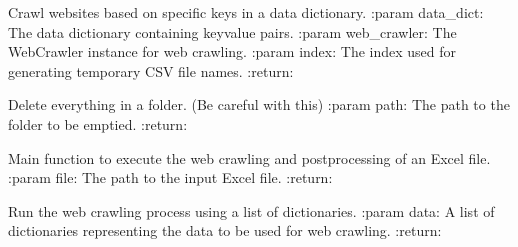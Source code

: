 \documentclass[letterpaper,10pt,english]{sphinxmanual}
\begin{document}

\begin{fulllineitems}
\label{\detokenize{main:main.crawl_with_keys}}
\pysigstartsignatures
{}
\pysigstopsignatures
\sphinxAtStartPar
Crawl websites based on specific keys in a data dictionary.
:param data\_dict: The data dictionary containing key\sphinxhyphen{}value pairs.
:param web\_crawler: The WebCrawler instance for web crawling.
:param index: The index used for generating temporary CSV file names.
:return:

\end{fulllineitems}


\begin{fulllineitems}
\label{\detokenize{main:main.empty_folder}}
\pysigstartsignatures
{}
\pysigstopsignatures
\sphinxAtStartPar
Delete everything in a folder. (Be careful with this)
:param path: The path to the folder to be emptied.
:return:

\end{fulllineitems}


\begin{fulllineitems}
\label{\detokenize{main:main.run}}
\pysigstartsignatures
{}
\pysigstopsignatures
\sphinxAtStartPar
Main function to execute the web crawling and post\sphinxhyphen{}processing of an Excel file.
:param file: The path to the input Excel file.
:return:

\end{fulllineitems}


\begin{fulllineitems}
\label{\detokenize{main:main.run_crawl}}
\pysigstartsignatures
{}
\pysigstopsignatures
\sphinxAtStartPar
Run the web crawling process using a list of dictionaries.
:param data: A list of dictionaries representing the data to be used for web crawling.
:return:

\end{fulllineitems}
\end{document}
